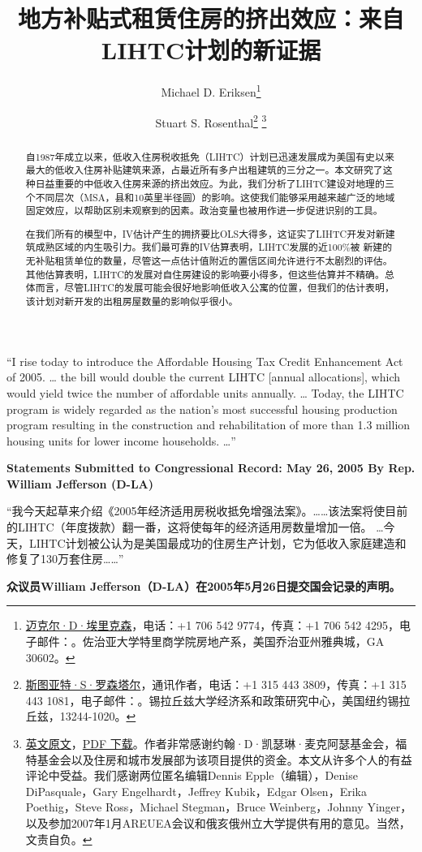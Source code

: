 \documentclass[lang=cn,11pt,a4paper]{paper}
\title{地方补贴式租赁住房的挤出效应：来自LIHTC计划的新证据}
\author{Michael D. Eriksen\thanks{\href{http://www.eriksen.myweb.uga.edu}{迈克尔·D·埃里克森}，电话：+1 706 542 9774，传真：+1 706 542 4295，电子邮件：\email{eriksen@terry.uga.edu}。佐治亚大学特里商学院房地产系，美国乔治亚州雅典城，GA 30602。} \and Stuart S. Rosenthal\thanks{\href{http://www.faculty.maxwell.syr.edu/rosenthal}{斯图亚特·S·罗森塔尔}，通讯作者，电话：+1 315 443 3809，传真：+1 315 443 1081，电子邮件：\email{ssrosent@maxwell.syr.edu}。锡拉丘兹大学经济系和政策研究中心，美国纽约锡拉丘兹，13244-1020。}\; \thanks{\href{https://www.sciencedirect.com/science/article/pii/S0047272710000885}{\faLink\;英文原文}，\href{https://sci-hub.tw/10.1016/j.jpubeco.2010.07.002}{\faFilePdf[regular]\;PDF 下载}。作者非常感谢约翰·D·凯瑟琳·麦克阿瑟基金会，福特基金会以及住房和城市发展部为该项目提供的资金。本文从许多个人的有益评论中受益。我们感谢两位匿名编辑Dennis Epple（编辑），Denise DiPasquale，Gary Engelhardt，Jeffrey Kubik，Edgar Olsen，Erika Poethig，Steve Ross，Michael Stegman，Bruce Weinberg，Johnny Yinger，以及参加2007年1月AREUEA会议和俄亥俄州立大学提供有用的意见。当然，文责自负。}}
\date{\zhtoday}
\begin{document}
\maketitle

\begin{abstract}
  \hspace{2\ccwd}自1987年成立以来，低收入住房税收抵免（LIHTC）计划已迅速发展成为美国有史以来最大的低收入住房补贴建筑来源，占最近所有多户出租建筑的三分之一。本文研究了这种日益重要的中低收入住房来源的挤出效应。为此，我们分析了LIHTC建设对地理的三个不同层次（MSA，县和10英里半径圆）的影响。这使我们能够采用越来越广泛的地域固定效应，以帮助区别未观察到的因素。政治变量也被用作进一步促进识别的工具。
  
  \!在我们所有的模型中，IV估计产生的拥挤要比OLS大得多，这证实了LIHTC开发对新建筑成熟区域的内生吸引力。我们最可靠的IV估算表明，LIHTC发展的近100\%被 新建的无补贴租赁单位的数量，尽管这一点估计值附近的置信区间允许进行不太剧烈的评估。其他估算表明，LIHTC的发展对自住房建设的影响要小得多，但这些估算并不精确。总体而言，尽管LIHTC的发展可能会很好地影响低收入公寓的位置，但我们的估计表明，该计划对新开发的出租房屋数量的影响似乎很小。

\end{abstract}
\vspace{10pt}

\begin{tcolorbox}[
	colback=yellow!10!white,
  colframe=red!30!black,
  fontupper = \itshape,
]
“I rise today to introduce the Affordable Housing Tax Credit Enhancement Act of 2005. … the bill would double the current LIHTC [annual allocations], which would yield twice the number of affordable units annually. … Today, the LIHTC program is widely regarded as the nation's most successful housing production program resulting in the construction and rehabilitation of more than 1.3 million housing units for lower income households. …”
\vspace{5pt}

\textbf{Statements Submitted to Congressional Record: May 26, 2005 By Rep. William Jefferson (D-LA)}

\tcblower

“我今天起草来介绍《2005年经济适用房税收抵免增强法案》。……该法案将使目前的LIHTC（年度拨款）翻一番，这将使每年的经济适用房数量增加一倍。 …今天，LIHTC计划被公认为是美国最成功的住房生产计划，它为低收入家庭建造和修复了130万套住房……”
\vspace{5pt}

\textbf{众议员William Jefferson（D-LA）在2005年5月26日提交国会记录的声明。}

\end{tcolorbox}
\vspace{10pt}
\end{document}
